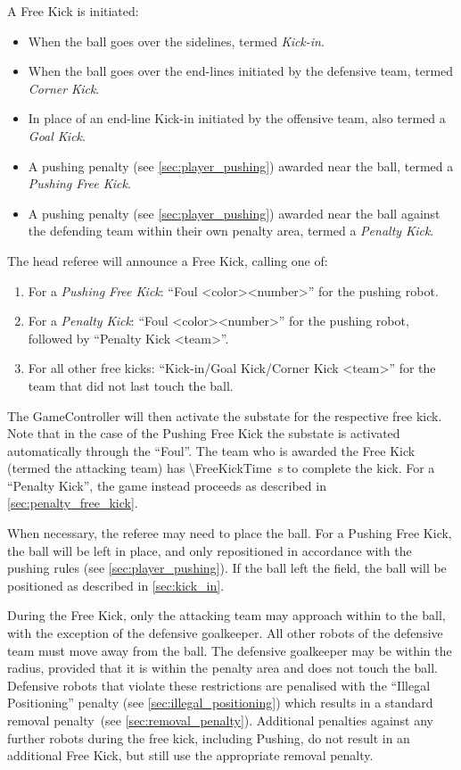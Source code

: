 A Free Kick is initiated:
\begin{itemize}
  \item When the ball goes over the sidelines, termed \emph{Kick-in}.
  \item When the ball goes over the end-lines initiated by the defensive team, termed \emph{Corner Kick}.
  \item In place of an end-line Kick-in initiated by the offensive team, also termed a \emph{Goal Kick}.
  \item A pushing penalty (see \cref{sec:player_pushing}) awarded near the ball, termed a \emph{Pushing Free Kick}.
  \item A pushing penalty (see \cref{sec:player_pushing}) awarded near the ball against the defending team within their own penalty area, termed a \textit{Penalty Kick}.
\end{itemize}

The head referee will announce a Free Kick, calling one of:
\begin{enumerate}
  \item For a \textit{Pushing Free Kick}: ``Foul \textless color\textgreater \textless number\textgreater'' for the pushing robot.
  \item For a \textit{Penalty Kick}: ``Foul \textless color\textgreater \textless number\textgreater'' for the pushing robot, followed by ``Penalty Kick \textless team\textgreater''.
  \item For all other free kicks: ``Kick-in/Goal Kick/Corner Kick \textless team\textgreater'' for the team that did not last touch the ball.
\end{enumerate}

The GameController will then activate the substate for the respective free kick. Note that in the case of the Pushing Free Kick the substate is activated automatically through the ``Foul''.
The team who is awarded the Free Kick (termed the attacking team) has \qty{\FreeKickTime}{\second} to complete the kick.
For a ``Penalty Kick'', the game instead proceeds as described in \cref{sec:penalty_free_kick}.

When necessary, the referee may need to place the ball.
For a Pushing Free Kick, the ball will be left in place, and only repositioned in accordance with the pushing rules (see \cref{sec:player_pushing}).
If the ball left the field, the ball will be positioned as described in \cref{sec:kick_in}.

During the Free Kick, only the attacking team may approach within \FreeKickRadius to the ball, with the exception of the defensive goalkeeper. All other robots of the defensive team must move away from the ball. The defensive goalkeeper may be within the \FreeKickRadius radius, provided that it is within the penalty area and does not touch the ball. Defensive robots that violate these restrictions are penalised with the ``Illegal Positioning'' penalty (see \cref{sec:illegal_positioning}) which results in a standard removal penalty~(see \cref{sec:removal_penalty}).
Additional penalties against any further robots during the free kick, including Pushing, do not result in an additional Free Kick, but still use the appropriate removal penalty.


